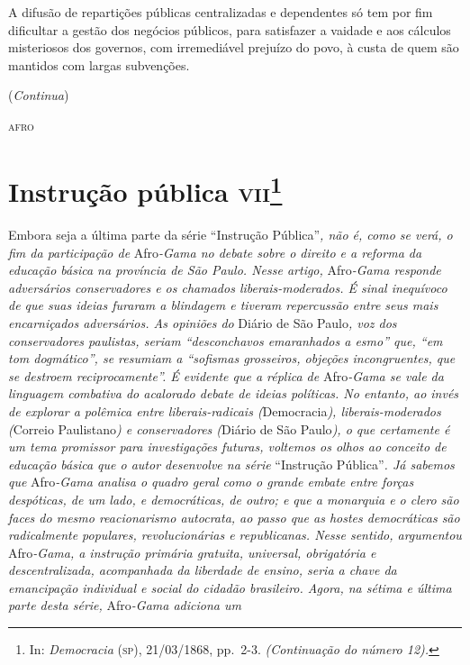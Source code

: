 A difusão de repartições públicas centralizadas e dependentes só tem por
fim dificultar a gestão dos negócios públicos, para satisfazer a vaidade
e aos cálculos misteriosos dos governos, com irremediável prejuízo do
povo, à custa de quem são mantidos com largas subvenções.

(\emph{Continua})
\begin{flushright}
\textsc{afro}
\end{flushright}
\chapter{Instrução pública \textsc{vii}\footnote{In: \emph{Democracia} (\textsc{sp}),
  21/03/1868, pp.~2-3. \emph{(Continuação do número 12).}}}

\begin{didascalia}
Embora seja a última parte da série ``Instrução Pública''\emph{, não é,
como se verá, o fim da participação de} Afro\emph{-Gama no debate sobre
o direito e a reforma da educação básica na província de São Paulo.
Nesse artigo,} Afro\emph{-Gama responde adversários conservadores e os
chamados liberais-moderados. É sinal inequívoco de que suas ideias
furaram a blindagem e tiveram repercussão entre seus mais encarniçados
adversários. As opiniões do} Diário de São Paulo\emph{, voz dos
conservadores paulistas, seriam ``desconchavos emaranhados a esmo'' que,
``em tom dogmático'', se resumiam a ``sofismas grosseiros, objeções
incongruentes, que se destroem reciprocamente''. É evidente que a réplica
de} Afro\emph{-Gama se vale da linguagem combativa do acalorado debate
de ideias políticas. No entanto, ao invés de explorar a polêmica entre
liberais-radicais (}Democracia\emph{), liberais-moderados (}Correio
Paulistano\emph{) e conservadores (}Diário de São Paulo\emph{), o que
certamente é um tema promissor para investigações futuras, voltemos os
olhos ao conceito de educação básica que o autor desenvolve na série}
``Instrução Pública''\emph{. Já sabemos que} Afro\emph{-Gama analisa o
quadro geral como o grande embate entre forças despóticas, de um lado, e
democráticas, de outro; e que a monarquia e o clero são faces do mesmo
reacionarismo autocrata, ao passo que as hostes democráticas são
radicalmente populares, revolucionárias e republicanas. Nesse sentido,
argumentou} Afro\emph{-Gama, a instrução primária gratuita, universal,
obrigatória e descentralizada, acompanhada da liberdade de ensino, seria
a chave da emancipação individual e social do cidadão brasileiro. Agora,
na sétima e última parte desta série,} Afro\emph{-Gama adiciona um
}
\end{didascalia}
